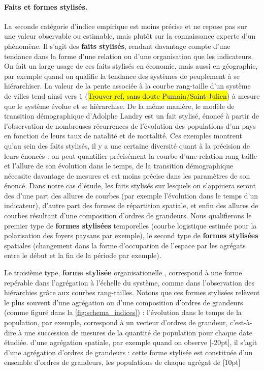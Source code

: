 \paragraph{Faits et formes stylisés.}
La seconde catégorie d'indice empirique est moins précise et ne repose pas sur une valeur observable ou estimable, mais plutôt sur la connaissance experte d'un phénomène.
Il s'agit des \og \textbf{faits stylisés}\fg{}\footnotemark{}, rendant davantage compte d'une tendance dans la forme d'une relation ou d'une organisation que les indicateurs.
On fait un large usage de ces faits stylisés en économie, mais aussi en géographie, par exemple quand on qualifie la tendance des systèmes de peuplement à se hiérarchiser.
La valeur de la pente associée à la courbe rang-taille d'un système de villes tend ainsi vers $1$ (\hl{Trouver ref, sans doute Pumain/Saint-Julien}) à mesure que le système évolue et se hiérarchise.
De la même manière, le modèle de transition démographique d'Adolphe Landry est un fait stylisé, énoncé à partir de l'observation de nombreuses récurrences de l'évolution des populations d'un pays en fonction de leurs taux de natalité et de mortalité.
Ces exemples montrent qu'au sein des faits stylisés, il y a une certaine diversité quant à la précision de leurs énoncés :
on peut quantifier précisément la courbe d'une relation rang-taille et l'allure de son évolution dans le temps,  de la transition démographique nécessite davantage de mesures et est moins précise dans les paramètres de son énoncé.
Dans notre cas d'étude, les faits stylisés sur lesquels on s'appuiera seront des d'une part des \og allures\fg{} de courbes (par exemple l'évolution dans le temps d'un indicateur), d'autre part des formes de répartition spatiale, et enfin des \og allures\fg{} de courbes résultant d'une composition d'ordres de grandeurs.
Nous qualifierons le premier type de \og \textbf{formes stylisées} temporelles\fg{} (courbe logistique estimée pour la polarisation des foyers paysans par exemple), le second type de \og \textbf{formes stylisées} spatiales\fg{} (changement dans la forme d'occupation de l'espace par les agrégats entre le début et la fin de la période par exemple).


Le troisième type, \og \textbf{forme stylisée} organisationelle \fg{}, correspond à une forme repérable dans l'agrégation à l'échelle du système, comme dans l'observation des hiérarchies grâce aux courbes rang-tailles.
Notons que ces formes stylisées relèvent le plus souvent d'une agrégation ou d'une composition d'ordres de grandeurs (comme figuré dans la \cref{fig:schema_indices}) :
l'évolution dans le temps de la population, par exemple, correspond à un vecteur d'ordres de grandeur, c'est-à-dire à une succession de mesures de la quantité de population pour chaque date étudiée.
 d'une agrégation spatiale, par exemple quand on observe [-20pt], il s'agit d'une agrégation d'ordres de grandeurs :
cette forme stylisée est constituée d'un ensemble d'ordres de grandeurs, les populations de chaque agrégat de [10pt]

